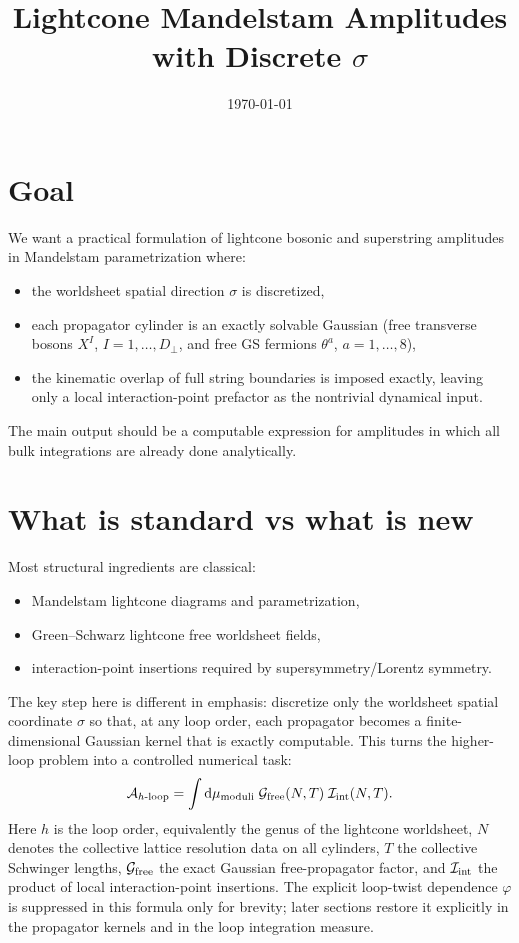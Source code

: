 \documentclass[11pt]{article}
\title{Lightcone Mandelstam Amplitudes with Discrete \texorpdfstring{$\sigma$}{sigma}}
\author{}
\date{\today}
\numberwithin{equation}{section}
\newcommand{\perpD}{D_\perp}
\newcommand{\dd}{\mathrm{d}}
\begin{document}
\maketitle

\section{Goal}
We want a practical formulation of lightcone bosonic and superstring amplitudes in Mandelstam parametrization where:
\begin{itemize}
\item the worldsheet spatial direction $\sigma$ is discretized,
\item each propagator cylinder is an exactly solvable Gaussian (free transverse bosons $X^I$, $I=1,\dots,\perpD$, and free GS fermions $\theta^a$, $a=1,\dots,8$),
\item the kinematic overlap of full string boundaries is imposed exactly, leaving only a local interaction-point prefactor as the nontrivial dynamical input.
\end{itemize}

The main output should be a computable expression for amplitudes in which all bulk integrations are already done analytically.

\section{What is standard vs what is new}
Most structural ingredients are classical:
\begin{itemize}
\item Mandelstam lightcone diagrams and parametrization,
\item Green--Schwarz lightcone free worldsheet fields,
\item interaction-point insertions required by supersymmetry/Lorentz symmetry.
\end{itemize}
The key step here is different in emphasis: discretize only the worldsheet spatial coordinate $\sigma$ so that, at any loop order, each propagator becomes a finite-dimensional Gaussian kernel that is exactly computable. This turns the higher-loop problem into a controlled numerical task:
\begin{equation}
\label{eq:s2-001}
\begin{aligned}
{\cal A}_{h\text{-loop}}
=\int \dd\mu_{\text{moduli}}\;
{\cal G}_{\text{free}}(N,T)\;
{\cal I}_{\text{int}}(N,T).
\end{aligned}
\end{equation}
Here $h$ is the loop order, equivalently the genus of the lightcone worldsheet, $N$ denotes the collective lattice resolution data on all cylinders, $T$ the collective Schwinger lengths, ${\cal G}_{\text{free}}$ the exact Gaussian free-propagator factor, and ${\cal I}_{\text{int}}$ the product of local interaction-point insertions. The explicit loop-twist dependence $\varphi$ is suppressed in this formula only for brevity; later sections restore it explicitly in the propagator kernels and in the loop integration measure.
\end{document}
